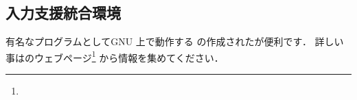 \subsection{入力支援統合環境\zdash \YaTeX}
%
有名なプログラムとしてGNU 上で動作する
の作成された\Prog[yatex]{\YaTeX}が便利です．
詳しい事は\prog{\YaTeX}のウェブページ\footnote{\webYaTeX}
から情報を集めてください．


